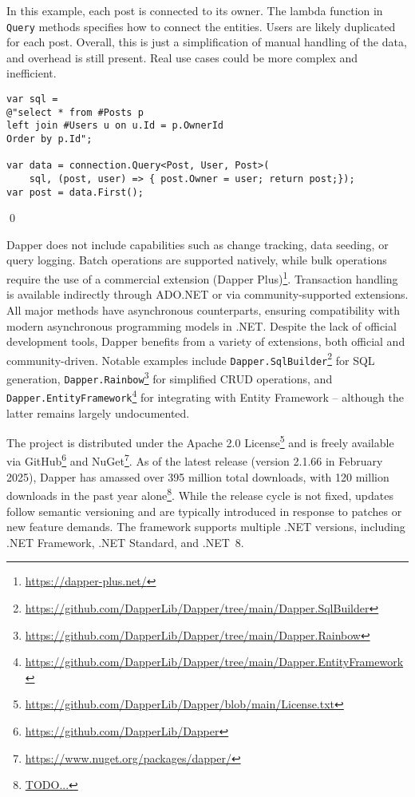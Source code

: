 \begin{example}
\small
In this example, each post is connected to its owner. The lambda function in \texttt{Query} methods specifies how to connect the entities. Users are likely duplicated for each post. Overall, this is just a simplification of manual handling of the data, and overhead is still present. Real use cases could be more complex and inefficient.

\begin{lstlisting}[language=CSharp]
var sql =
@"select * from #Posts p
left join #Users u on u.Id = p.OwnerId
Order by p.Id";

var data = connection.Query<Post, User, Post>(
    sql, (post, user) => { post.Owner = user; return post;});
var post = data.First();
\end{lstlisting}
\qed
\end{example}

Dapper does not include capabilities such as change tracking, data seeding, or query logging. Batch operations are supported natively, while bulk operations require the use of a commercial extension (Dapper Plus)\footnote{\url{https://dapper-plus.net/}}. Transaction handling is available indirectly through ADO.NET or via community-supported extensions. All major methods have asynchronous counterparts, ensuring compatibility with modern asynchronous programming models in .NET. Despite the lack of official development tools, Dapper benefits from a variety of extensions, both official and community-driven. Notable examples include \texttt{Dapper.SqlBuilder}\footnote{\url{https://github.com/DapperLib/Dapper/tree/main/Dapper.SqlBuilder}} for SQL generation, \texttt{Dapper.Rainbow}\footnote{\url{https://github.com/DapperLib/Dapper/tree/main/Dapper.Rainbow}} for simplified CRUD operations, and \texttt{Dapper.EntityFramework}\footnote{\url{https://github.com/DapperLib/Dapper/tree/main/Dapper.EntityFramework}} for integrating with Entity Framework -- although the latter remains largely undocumented.

The project is distributed under the Apache 2.0 License\footnote{\url{https://github.com/DapperLib/Dapper/blob/main/License.txt}} and is freely available via GitHub\footnote{\url{https://github.com/DapperLib/Dapper}} and NuGet\footnote{\url{https://www.nuget.org/packages/dapper/}}. As of the latest release (version 2.1.66 in February 2025), Dapper has amassed over 395 million total downloads, with 120 million downloads in the past year alone\footnote{\url{TODO...}}. While the release cycle is not fixed, updates follow semantic versioning and are typically introduced in response to patches or new feature demands. The framework supports multiple .NET versions, including .NET Framework, .NET Standard, and .NET~8.

